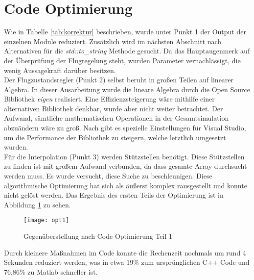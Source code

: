 \section{Code Optimierung}
Wie in Tabelle \ref{tab:korrektur} beschrieben, wurde unter Punkt 1 der Output der einzelnen Module reduziert. Zusätzlich wird im nächsten Abschnitt nach Alternativen für die \textit{std::to\_string} Methode gesucht. Da das Hauptaugenmerk auf der Überprüfung der Flugregelung steht, wurden Parameter vernachlässigt, die wenig Aussagekraft darüber besitzen.\\ Der Flugzustandsregler (Punkt 2) selbst beruht in großen Teilen auf linearer Algebra. In dieser Ausarbeitung wurde die lineare Algebra durch die Open Source Bibliothek \textit{eigen} realisiert. Eine Effizienzsteigerung wäre mithilfe einer alternativen Bibliothek denkbar, wurde aber nicht weiter betrachtet. Der Aufwand, sämtliche mathematischen Operationen in der Gesamtsimulation abzuändern wäre zu groß. Nach \cite{TuxFamily.2018} gibt es spezielle Einstellungen für Visual Studio, um die Performance der Bibliothek zu steigern, welche letztlich umgesetzt wurden. \\  Für die Interpolation (Punkt 3) werden Stützstellen benötigt. Diese Stützstellen zu finden ist mit großem Aufwand verbunden, da dass gesamte Array durchsucht werden muss. Es wurde versucht, diese Suche zu beschleunigen. Diese algorithmische Optimierung hat sich als äußerst komplex rausgestellt und konnte nicht gelöst werden. Das Ergebnis des ersten Teils der Optimierung ist in Abbildung \ref{fig:opt1} zu sehen.\newpage
\begin{figure}[h]
	\centering
	\texttt{[image: opt1]}
	\caption{Gegenüberstellung nach Code Optimierung Teil 1}
	\label{fig:opt1}
\end{figure}\noindent
Durch kleinere Maßnahmen im Code konnte die Rechenzeit nochmals um rund 4 Sekunden reduziert werden, was in etwa 19\% zum ursprünglichen C++ Code und 76,86\% zu Matlab schneller ist.
